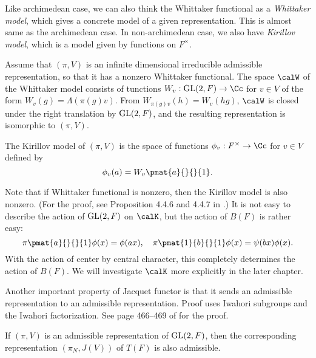 Like archimedean case, we can also think the Whittaker functional as a \emph{Whittaker model}, which gives a concrete model of a given representation. This is almost same as the archimedean case. 
In non-archimedean case, we also have \emph{Kirillov model}, which is a model given by functions on $F^{\times}$. 
\begin{definition}
Assume that $(\pi, V)$ is an infinite dimensional irreducible admissible representation, so that it has a nonzero Whittaker functional.  The space $\calW$ of the Whittaker model consists of tunctions $W_{v}:\GL(2, F) \to \Cc$ for $v\in V$ of the form $W_{v}(g) = \Lambda(\pi(g)v)$. From $W_{\pi(g)v}(h) = W_{v}(hg)$,  $\calW$ is closed under the right translation by $\mathrm{GL}(2, F)$, and the resulting representation is isomorphic to $(\pi, V)$. 

The Kirillov model of $(\pi, V)$ is the space of functions $\phi_v:F^{\times} \to \Cc$ for $v\in V$ defined by 
$$
\phi_v(a) = W_{v} \pmat{a}{}{}{1}. 
$$
\end{definition}
Note that if Whittaker functional is nonzero, then the Kirillov model is also nonzero. (For the proof, see Proposition 4.4.6 and 4.4.7 in \cite{bu}.) It is not easy to describe the action of $\mathrm{GL}(2, F)$ on $\calK$, but the action of $B(F)$ is rather easy: 
$$
\pi\pmat{a}{}{}{1} \phi(x) = \phi(ax), \quad \pi\pmat{1}{b}{}{1}\phi(x) = \psi(bx)\phi(x). 
$$
With the action of center by central character, this completely determines the action of $B(F)$. We will investigate $\calK$ more explicitly in the later chapter. 

Another important property of Jacquet functor is that it sends an admissible representation to an admissible representation. Proof uses Iwahori subgroups and the Iwahori factorization. See page 466--469 of \cite{bu} for the proof. 
\begin{theorem}
\label{jacadm}
If $(\pi, V)$ is an admissible representation of $\mathrm{GL}(2, F)$, then the corresponding representation $(\pi_N, J(V))$ of $T(F)$ is also admissible.
\end{theorem}




